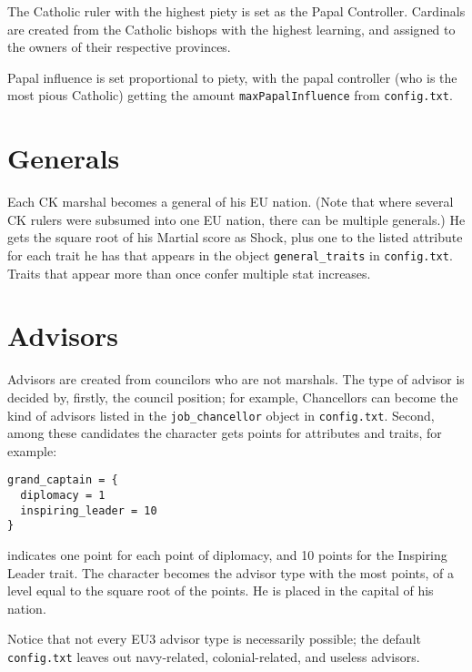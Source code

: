 \documentclass[12pt,ebook,oneside]{book}
\begin{document}
The Catholic ruler with the highest piety is set as the Papal
Controller. Cardinals are created from the Catholic bishops with the
highest learning, and assigned to the owners of their respective
provinces. 

Papal influence is set proportional to piety, with the papal
controller (who is the most pious Catholic) getting the amount
\verb|maxPapalInfluence| from \verb|config.txt|. 

\section{Generals}

Each CK marshal becomes a general of his EU nation. (Note that where
several CK rulers were subsumed into one EU nation, there can be
multiple generals.) He gets the
square root of his Martial score as Shock, plus one to the listed
attribute for each trait he has that appears in the object
\verb|general_traits| in \verb|config.txt|. Traits that appear more
than once confer multiple stat increases. 

\section{Advisors}

Advisors are created from councilors who are not marshals. The type of
advisor is decided by, firstly, the council position; for example,
Chancellors can become the kind of advisors listed in the
\verb|job_chancellor| object in \verb|config.txt|. Second, among these
candidates the character gets points for attributes and traits, for
example:
\begin{verbatim}
grand_captain = {
  diplomacy = 1
  inspiring_leader = 10
} 
\end{verbatim}
indicates one point for each point of diplomacy, and 10 points for the
Inspiring Leader trait. The character becomes the advisor type with
the most points, of a level equal to the square root of the points. 
He is placed in the capital of his nation. 

Notice that not every EU3 advisor type is necessarily possible; the
default \verb|config.txt| leaves out navy-related, colonial-related,
and useless advisors. 
\end{document}
